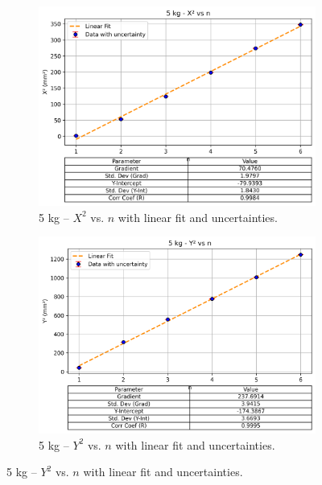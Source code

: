\documentclass[a4paper,11pt]{article}
\begin{document}
\begin{figure}[H]
  \begin{subfigure}[b]{0.45\textwidth}
    \centering
    \includegraphics[width=\textwidth]{5kg_X2_vs_n_with_errorbar.png}
    \caption{5 kg -- \(X^2\) vs. \(n\) with linear fit and uncertainties.}
    \label{fig:5kgX2vsn}
  \end{subfigure}
  \hfill
  \begin{subfigure}[b]{0.45\textwidth}
    \centering
    \includegraphics[width=\textwidth]{5kg_Y2_vs_n_with_errorbar.png}
    \caption{5 kg -- \(Y^2\) vs. \(n\) with linear fit and uncertainties.}
    \label{fig:5kgY2vsn}
  \end{subfigure}
  
  \vspace{1em} %
  

\end{figure}
\end{document}
